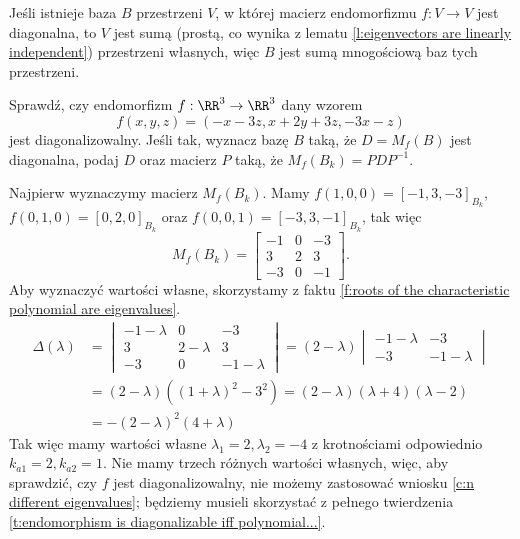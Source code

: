 \begin{remark}
    \label{r:about base of diagonal matrix of endomorphism}
    Jeśli istnieje baza $B$ przestrzeni $V$, w której macierz endomorfizmu $f: V \to V$ jest diagonalna, to $V$ jest sumą (prostą, co wynika z lematu \ref{l:eigenvectors are linearly independent}) przestrzeni własnych, więc $B$ jest sumą mnogościową baz tych przestrzeni.
\end{remark}

\begin{example}
    Sprawdź, czy endomorfizm $f : \RR^3 \to \RR^3$ dany wzorem
    \[ f(x, y, z) = (-x-3z, x + 2y + 3z, -3x - z) \]
    jest diagonalizowalny. Jeśli tak, wyznacz bazę $B$ taką, że $D = M_f(B)$ jest diagonalna, podaj $D$ oraz macierz $P$ taką, że $M_f(B_k) = PDP^{-1}$.
\end{example}
\begin{solution}
    Najpierw wyznaczymy macierz $M_f(B_k)$. Mamy $f(1, 0, 0) = [-1, 3, -3]_{B_k}$, $f(0, 1, 0) = [0, 2, 0]_{B_k}$ oraz $f(0, 0, 1) = [-3, 3, -1]_{B_k}$, tak więc
    \[ M_f(B_k) = \begin{bmatrix}
        -1 & 0 & -3 \\
        3 & 2 & 3 \\
        -3 & 0 & -1
    \end{bmatrix}. \]
    Aby wyznaczyć wartości własne, skorzystamy z faktu \ref{f:roots of the characteristic polynomial are eigenvalues}.
    \begin{align*} \Delta(\lambda) &=
        \begin{vmatrix}
            -1 - \lambda & 0 & -3 \\
            3 & 2 - \lambda & 3 \\
            -3 & 0 & -1 - \lambda
        \end{vmatrix} = (2 - \lambda) \begin{vmatrix}
            -1 - \lambda & -3 \\
            -3 & -1 - \lambda
        \end{vmatrix} \\
        &= (2 - \lambda)((1 + \lambda)^2 - 3^2) = (2 - \lambda)(\lambda + 4)(\lambda - 2) \\
        &= -(2 - \lambda)^2(4 + \lambda)
    \end{align*}
    Tak więc mamy wartości własne $\lambda_1 = 2, \lambda_2 = -4$ z krotnościami odpowiednio $k_{a1} = 2, k_{a2} = 1$. Nie mamy trzech różnych wartości własnych, więc, aby sprawdzić, czy $f$ jest diagonalizowalny, nie możemy zastosować wniosku \ref{c:n different eigenvalues}; będziemy musieli skorzystać z pełnego twierdzenia \ref{t:endomorphism is diagonalizable iff polynomial...}.


\end{solution}
